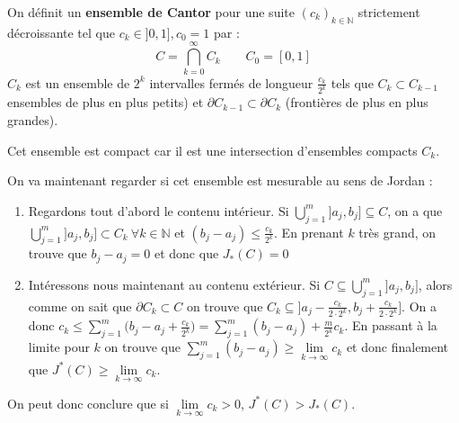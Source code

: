 \begin{example}
    On définit un \textbf{ensemble de Cantor} pour une suite $(c_k)_{k\in\mathbb{N}}$ strictement décroissante tel que $c_k \in ]0,1], c_0=1$ par :
    \begin{equation*}
        C = \bigcap_{k=0}^\infty C_k \qquad C_0 = [0,1]
    \end{equation*}
    $C_k$ est un ensemble de $2^k$ intervalles fermés de longueur $\frac{c_k}{2^k}$ tels que $C_k\subset C_{k-1}$ ensembles de plus en plus petits) et $\partial C_{k-1}\subset \partial C_k$ (frontières de plus en plus grandes).
    
    Cet ensemble est compact car il est une intersection d'ensembles compacts $C_k$.
    \begin{figure}[H]
        \centering
    \end{figure}
    On va maintenant regarder si cet ensemble est mesurable au sens de Jordan :
    \begin{enumerate}[label=(\roman*)]
        \item Regardons tout d'abord le contenu intérieur. Si $\bigcup_{j=1}^m]a_j,b_j]\subseteq C$, on a que $\bigcup_{j=1}^m]a_j,b_j]\subset C_k \ \forall k\in\mathbb{N}$ et $(b_j-a_j)\leq\frac{c_k}{2^k}$. En prenant $k$ très grand, on trouve que $b_j-a_j = 0$ et donc que $J_*(C)=0$
        \item Intéressons nous maintenant au contenu extérieur. Si $C\subseteq \bigcup_{j=1}^m]a_j,b_j]$, alors comme on sait que $\partial C_k\subset C$ on trouve que $C_k\subseteq\big]a_j-\frac{c_k}{2\cdot2^k},b_j+\frac{c_k}{2\cdot2^k}\big]$. On a donc $c_k \leq \sum_{j=1}^m\big(b_j-a_j+\frac{c_k}{2^k}\big) = \sum_{j=1}^m(b_j-a_j)+\frac{m}{2^k}c_k$. En passant à la limite pour $k$ on trouve que $\sum_{j=1}^m(b_j-a_j)\geq\lim\limits_{k\to\infty}c_k$ et donc finalement que $J^*(C)\geq\lim\limits_{k\to\infty}c_k$.
    \end{enumerate}
    On peut donc conclure que si $\lim\limits_{k\to\infty}c_k>0$, $J^*(C)>J_*(C)$.
\end{example}

